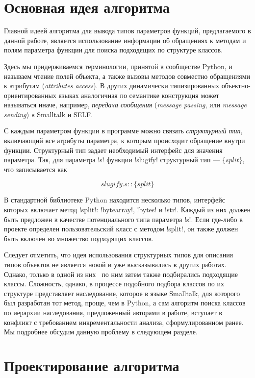 \section{Основная идея алгоритма}
\label{sec:main-idea}

Главной идеей алгоритма для вывода типов параметров функций, предлагаемого в
данной работе, является использование информации об обращениях к методам и полям
параметра функции для поиска подходящих по структуре классов. 

Здесь мы придерживаемся терминологии, принятой в сообществе Python, и называем
чтение полей объекта, а также вызовы методов совместно обращениями к атрибутам
(\emph{attributes access}). В других динамически типизированных
объектно-ориентированных языках аналогичная по семантике конструкция может
называться иначе, например, \emph{передача сообщения} (\emph{message passing},
или \emph{message sending}) в Smalltalk и SELF.

С каждым параметром функции в программе можно связать \emph{структурный тип},
включающий все атрибуты параметра, к которым происходит обращение внутри
функции. Структурный тип задает необходимый интерфейс для значения параметра.
Так, для параметра !s! функции !slugify! структурный тип --- $\{split\}$, что
записывается как 

\[
    slugify.s :: \{ split \}
\]

В стандартной библиотеке Python находится несколько типов, интерфейс которых
включает метод !split!: !bytearray!, !bytes! и !str!. Каждый из
них должен быть предложен в качестве потенциального типа параметра !s!. Если
где-либо в проекте определен пользовательский класс с методом !split!, он также
должен быть включен во множество подходящих классов.

Следует отметить, что идея использования структурных типов для описания типов
объектов не является новой и уже высказывались в других работах.  Однако, только
в одной из них~\cite{Pluquet2009} по ним затем также подбирались подходящие
классы. Сложность, однако, в процессе подобного подбора классов по их
структуре представляет наследование, которое в языке Smalltalk, для которого был
разработан тот метод, проще, чем в Python, а сам алгоритм поиска классов по
иерархии наследования, предложенный авторами в работе, вступает в конфликт с
требованием инкрементальности анализа, сформулированном ранее. Мы подробнее
обсудим данную проблему в следующем разделе.

\section{Проектирование алгоритма}
\label{sec:algorithm-design}

